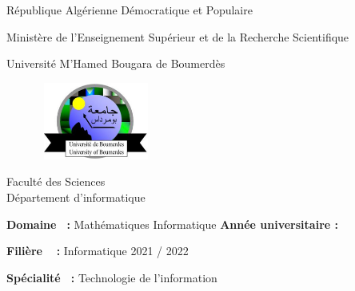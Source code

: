 \documentclass[12pt]{report}
\begin{document}
\begin{titlepage}


   \begin{center}
       \vspace*{-0.4in}

       \begin{large}

           République Algérienne Démocratique et Populaire

           Ministère de l'Enseignement Supérieur et de la Recherche Scientifique

           Université M'Hamed Bougara de Boumerdès

       \end{large}

       \vspace{0.1in}

    \begin{figure}[h]
    \centering
        \includegraphics[width = 1.5in, height = 1in]{../images/UnivUMBB.jpg}
    \end{figure}
     \vspace*{-0.1in}
    \large{Faculté des Sciences}
    \\
    \vspace*{-0.1in}
    \large{Département d'informatique}
   \end{center}

    \hspace{0.2in}
    \large{\textbf{Domaine \,\; :}  Mathématiques Informatique}
    \kern 1in
    \large{\textbf{Année universitaire :}}

    \hspace{0.2in}
    \large{\textbf{Filière \quad\,\,\, :}  Informatique}
    \kern 2.65in
    2021 / 2022

    \hspace{0.2in}
    \large{\textbf{Spécialité \, :}  Technologie de l'information}


\end{titlepage}
\end{document}
